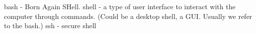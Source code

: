 bash - Born Again SHell.
shell - a type of user interface to interact with the computer through commands.
        (Could be a desktop shell, a GUI. Usually we refer to the bash.)
ssh - secure shell
